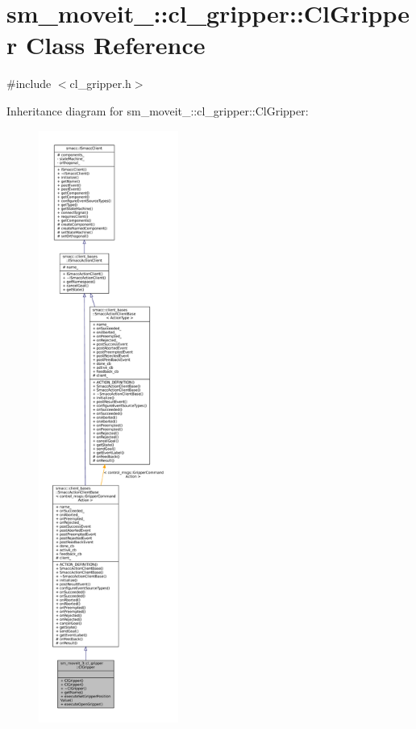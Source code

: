\hypertarget{classsm__moveit__3_1_1cl__gripper_1_1ClGripper}{}\section{sm\+\_\+moveit\+\_\+:\+:cl\+\_\+gripper\+:\+:Cl\+Gripper Class Reference}
\label{classsm__moveit__3_1_1cl__gripper_1_1ClGripper}


{\ttfamily \#include $<$cl\+\_\+gripper.\+h$>$}



Inheritance diagram for sm\+\_\+moveit\+\_\+:\+:cl\+\_\+gripper\+:\+:Cl\+Gripper\+:
\nopagebreak
\begin{figure}[H]
\begin{center}
\leavevmode
\includegraphics[height=550pt]{classsm__moveit__3_1_1cl__gripper_1_1ClGripper__inherit__graph}
\end{center}
\end{figure}



